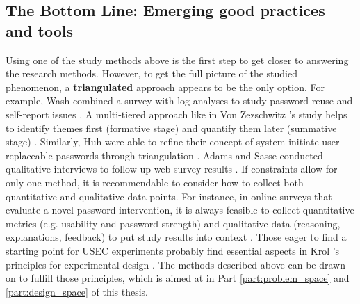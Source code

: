 \subsection{The Bottom Line: Emerging good practices and tools}
Using one of the study methods above is the first step to get closer to answering the research methods. However, to get the full picture of the studied phenomenon, a \textbf{triangulated} approach appears to be the only option. For example, Wash \etal combined a survey with log analyses to study password reuse and self-report issues \cite{Wash2016UnderstandingPasswordChoices}. A multi-tiered approach like in Von Zezschwitz \etal's study helps to identify themes first (formative stage) and quantify them later (summative stage) \cite{VonZezschwitz2014HoneyIShrunkTheKeys}. Similarly, Huh \etal were able to refine their concept of system-initiate user-replaceable passwords through triangulation \cite{Huha2015UserReplaceablePasswords}. Adams and Sasse conducted qualitative interviews to follow up web survey results \cite{Adams1999UsersEnemy}. If constraints allow for only one method, it is recommendable to consider how to collect both quantitative and qualitative data points. For instance, in online surveys that evaluate a novel password intervention, it is always feasible to collect quantitative metrics (e.g. usability and password strength) and qualitative data (reasoning, explanations, feedback) to put study results into context \cite{Adams1999UsersEnemy}. Those eager to find a starting point for \gls{USEC} experiments probably find essential aspects in Krol \etal's principles for experimental design \cite{Krol2016ExperimentDesign}. The methods described above can be drawn on to fulfill those principles, which is aimed at in Part \ref{part:problem_space} and \ref{part:design_space} of this thesis. 


  


